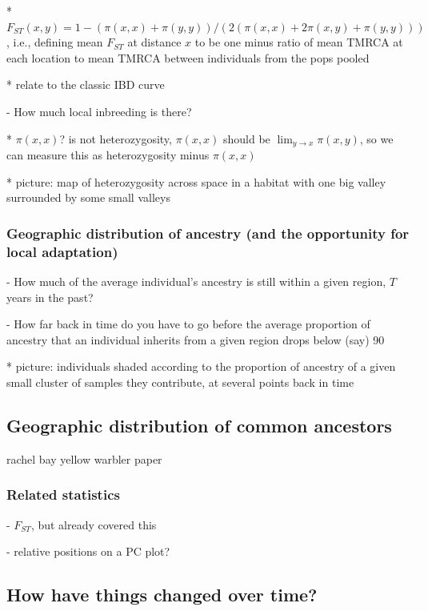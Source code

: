 \documentclass{ar-1col}
\begin{document}
            * $F_{ST}(x,y) = 1 - (\pi(x,x) + \pi(y,y))/(2 (\pi(x,x) + 2 \pi(x,y) + \pi(y,y)))$, 
                i.e., defining mean $F_{ST}$ at distance $x$ to be one minus ratio of mean TMRCA at each location
                to mean TMRCA between individuals from the pops pooled

            * relate to the classic IBD curve

        - How much local inbreeding is there?

            * $\pi(x,x)$? is not heterozygosity, $\pi(x,x)$ should be $\lim_{y \to x} \pi(x,y)$,
                so we can measure this as heterozygosity minus $\pi(x,x)$

            * picture: map of heterozygosity across space in a habitat with one big valley surrounded by some small valleys


\subsubsection{Geographic distribution of ancestry (and the opportunity for local adaptation)}

        - How much of the average individual's ancestry is still within a given region, $T$ years in the past?

        - How far back in time do you have to go before the average proportion of ancestry that an individual inherits
            from a given region drops below (say) 90%
            
            * picture: individuals shaded according to the proportion of ancestry of a given small cluster of samples
                they contribute, at several points back in time
                
\subsection{Geographic distribution of common ancestors}
	rachel bay yellow warbler paper

\subsubsection{Related statistics}

        - $F_{ST}$, but already covered this

        - relative positions on a PC plot?

\subsection{How have things changed over time?}
\end{document}
